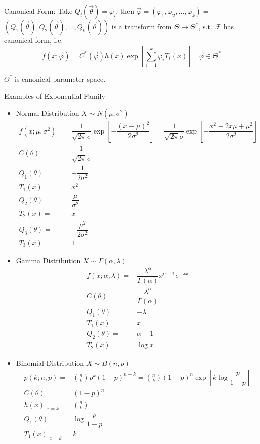     Canonical Form: Take $Q_i(\vec{\theta})=\varphi_i$, then $\vec{\varphi}=(\varphi_1,\varphi_2,\ldots,\varphi_k)=$$(Q_1(\vec{\theta}),Q_2(\vec{\theta}),\ldots,Q_k(\vec{\theta}))$ is a transform from $\Theta\mapsto\Theta^*$, s.t. $\mathscr{F}$ has canonical form, i.e.
    \begin{equation}\label{EqaExponentialDistributionFamily}
        f(x;\vec{\varphi})=C^*(\vec{\varphi})h(x)   \exp\left[  \sum_{i=1}^k \varphi_i T_i(x) \right] \quad \vec{\varphi}\in\Theta^*
    \end{equation}

    $\Theta^*$ is canonical parameter space.

    
\begin{point}
    Examples of Exponential Family
\end{point}
\begin{itemize}[topsep=2pt,itemsep=0pt]
    \item Normal Distribution $ X\sim N(\mu ,\sigma ^2) $
    \begin{align}
        f(x;\mu ,\sigma ^2)=&\dfrac{1}{\sqrt{2\pi}\sigma }\exp\left[ -\dfrac{(x-\mu )^2}{2\sigma ^2} \right]=\dfrac{1}{\sqrt{2\pi}\sigma }\exp\left[ -\dfrac{x^2-2x\mu +\mu ^2}{2\sigma ^2} \right]\\
        C(\theta )=&\dfrac{1}{\sqrt{2\pi}\sigma }\\
        Q_1(\theta )=&-\dfrac{1}{2\sigma ^2}\\
        T_1(x)=&x^2\\
        Q_2(\theta )=&\dfrac{\mu }{\sigma ^2}\\
        T_2(x)=&x\\
        Q_3(\theta )=&-\dfrac{\mu ^2}{2\sigma ^2}\\
        T_3(x)=&1
    \end{align}
    \item Gamma Distribution $ X\sim \Gamma (\alpha ,\lambda ) $
    \begin{align}
        f(x;\alpha ,\lambda )=&\dfrac{\lambda ^\alpha }{\Gamma (\alpha )}x^{\alpha -1}e^{-\lambda x}\\
        C(\theta )=&\dfrac{\lambda ^\alpha }{\Gamma (\alpha )}\\
        Q_1(\theta )=&-\lambda \\
        T_1(x)=&x\\
        Q_2(\theta )=&\alpha -1\\
        T_2(x)=&\log x
    \end{align}
    \item Binomial Distribution $ X\sim B(n,p) $
    \begin{align}
        p(k;n,p)=&\binom{n}{k}p^k(1-p)^{n-k}=\binom{n}{k}(1-p)^n\exp\left[ k\log\dfrac{p }{1-p} \right]\\
        C(\theta )=&(1-p)^n\\
        h(x)\mathop{=}\limits_{x=k} &\binom{n}{k}\\
        Q_1(\theta )=&\log\dfrac{p}{1-p}\\
        T_1(x)\mathop{=}\limits_{x=k}&k 
    \end{align}
    
    
\end{itemize}

